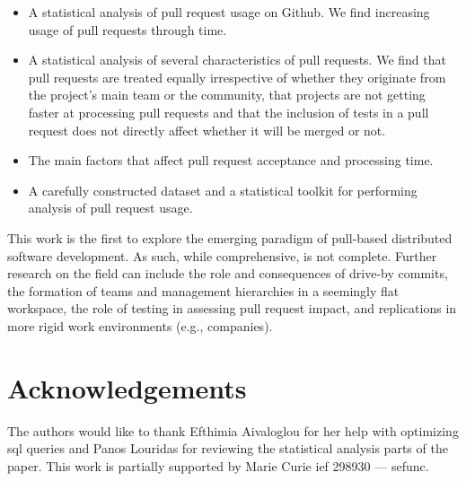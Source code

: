 \documentclass{acm_proc_article-sp}
\begin{document}
\begin{itemize}

  \item A statistical analysis of pull request usage on Github.
    We find increasing usage of pull requests through time.

  \item A statistical analysis of several characteristics of pull requests.
    We find that pull requests are treated equally irrespective of whether they
    originate from the project's main team or the community, that projects
    are not getting faster at processing pull requests and that the inclusion of
    tests in a pull request does not directly affect whether it will be merged or not.

  \item The main factors that affect pull request acceptance and
    processing time. 

  \item A carefully constructed dataset and a statistical toolkit for
    performing analysis of pull request usage.

\end{itemize}


This work is the first to explore the emerging paradigm of pull-based
distributed software development. As such, while comprehensive, is not complete.
Further research on the field can include the role and consequences of drive-by
commits, the formation of teams and management hierarchies in a seemingly flat
workspace, the role of testing in assessing pull request impact, and
replications in more rigid work environments (e.g., companies).

\section*{Acknowledgements}

The authors would like to thank Efthimia Aivaloglou for her help with 
optimizing {\sc sql} queries and Panos Louridas for reviewing the 
statistical analysis parts of the paper.
This work is partially supported by Marie Curie {\sc ief} 298930 --- {\sc sefunc}.


\balance

\end{document}
